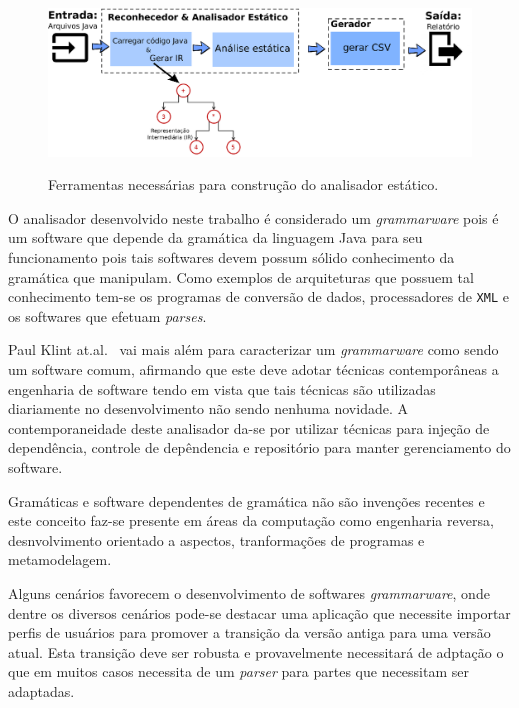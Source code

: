 \begin{figure}[h]
	\center
	\includegraphics[scale=0.9]{Imagens/stagesAnalizer}
	\label{fig:stagesAnalyzer}
	\caption{Ferramentas necess\'{a}rias para constru\c{c}\~{a}o do analisador est\'{a}tico.}
\end{figure}

O analisador desenvolvido neste trabalho \'{e} considerado um {\it grammarware} pois \'{e} um software que depende da gram\'{a}tica da linguagem Java para seu funcionamento pois tais softwares devem possum s\'{o}lido conhecimento da  gram\'{a}tica que manipulam. Como exemplos de arquiteturas que possuem tal conhecimento tem-se os programas de convers\~{a}o de dados, processadores de \texttt{XML} e os softwares que efetuam \textit{parses}.

Paul Klint at.al.~\cite{klint2005toward} vai mais al\'{e}m para caracterizar um {\it grammarware} como sendo um software comum, afirmando que este deve  adotar t\'{e}cnicas contempor\^{a}neas a engenharia de software tendo em vista que tais t\'{e}cnicas s\~{a}o utilizadas diariamente no desenvolvimento n\~{a}o sendo nenhuma novidade. A contemporaneidade deste analisador da-se por utilizar t\'{e}cnicas para inje\c{c}\~{a}o de depend\^{e}ncia, controle de dep\^{e}ndencia e  reposit\'{o}rio para manter gerenciamento do software.

Gram\'{a}ticas e software dependentes de gram\'{a}tica n\~{a}o s\~{a}o inven\c{c}\~{o}es recentes e este conceito faz-se presente em \'{a}reas da computa\c{c}\~{a}o como engenharia reversa, desnvolvimento orientado a aspectos, tranforma\c{c}\~{o}es de programas e metamodelagem.

Alguns cen\'{a}rios favorecem o desenvolvimento de softwares {\it grammarware}, onde dentre os diversos cen\'{a}rios pode-se destacar uma aplica\c{c}\~{a}o que necessite importar perfis de usu\'{a}rios para promover a transi\c{c}\~{a}o da vers\~{a}o antiga para uma vers\~{a}o atual. Esta transi\c{c}\~{a}o deve ser robusta e provavelmente necessitar\'{a} de adpta\c{c}\~{a}o o que em muitos casos necessita de um \textit{parser} para partes que necessitam ser adaptadas.

